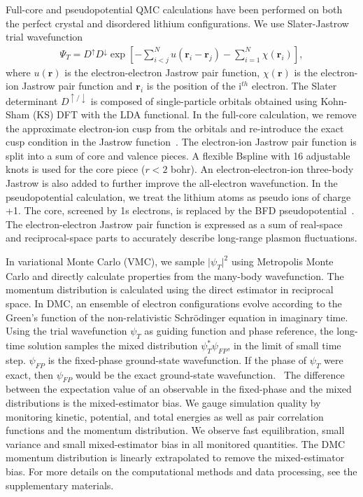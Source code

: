 \documentclass[aps,prb,showpacs,preprintnumbers,amsmath,amssymb,superscriptaddress,twocolumn]{revtex4-1}
\newcommand{\bs}{\boldsymbol}
\newcommand{\up}{\uparrow}
\newcommand{\down}{\downarrow}
\begin{document}
Full-core and pseudopotential QMC calculations have been performed on both  the perfect crystal and disordered lithium configurations. %
We use Slater-Jastrow trial wavefunction
\begin{align}
\Psi_T = D^{\up} D^{\down} \exp\left[ -\sum\limits_{i<j}^{N} u(\bs{r}_i-\bs{r}_j) - \sum\limits_{i=1}^N \chi(\bs{r}_i) \right],\label{eq:sj}
\end{align}
where $u(\bs{r})$ is the electron-electron Jastrow pair function, $\chi(\bs{r})$ is the electron-ion Jastrow pair function and $\bs{r}_i$ is the position of the i$^{th}$ electron. The Slater determinant $D^{\up/\down}$ is composed of single-particle orbitals obtained using Kohn-Sham (KS) DFT with the LDA functional. In the full-core calculation, we remove the approximate electron-ion cusp from the orbitals and re-introduce the exact cusp condition in the Jastrow function~\cite{Ceperley1981}. The electron-ion Jastrow pair function is split into a sum of core and valence pieces. A flexible Bspline with 16 adjustable knots is used for the core piece ($r<2$ bohr). An electron-electron-ion three-body Jastrow is also added to further improve the all-electron wavefunction. In the pseudopotential calculation, we treat the lithium atoms as pseudo ions of charge +1. The core, screened by 1s electrons, is replaced by the BFD pseudopotential~\cite{Burkatzki2007}.  The electron-electron Jastrow pair function is expressed as a sum of real-space and reciprocal-space parts to accurately describe long-range plasmon fluctuations.

In variational Monte Carlo (VMC), we sample $\vert \psi_T \vert^2$ using Metropolis Monte Carlo and directly calculate properties from the many-body wavefunction. The momentum distribution is calculated using the direct estimator in reciprocal space\cite{McMillan1965}. In DMC, an ensemble of electron configurations evolve according to the Green's function of the non-relativistic Schr\"odinger equation in imaginary time. Using the trial wavefunction $\psi_T$ as guiding function and phase reference, the long-time solution samples the mixed distribution $\psi^*_T\psi_{FP}$, in the limit of small time step. $\psi_{FP}$ is the fixed-phase ground-state wavefunction. If the phase of $\psi_T$ were exact, then $\psi_{FP}$ would be the exact ground-state wavefunction.~\cite{Ortiz1993} The difference between the expectation value of an observable in the fixed-phase and the mixed distributions is the mixed-estimator bias. We gauge simulation quality by monitoring kinetic, potential, and total energies as well as pair correlation functions and the momentum distribution. We observe fast equilibration, small variance and small mixed-estimator bias in all monitored quantities. The DMC momentum distribution is linearly extrapolated to remove the mixed-estimator bias. For more details on the computational methods and data processing, see the supplementary materials.
\end{document}
